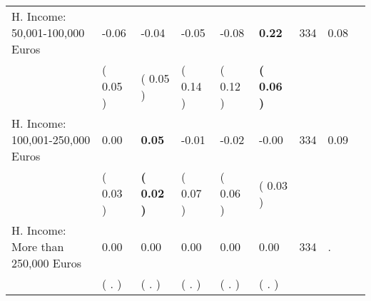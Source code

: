 \begin{tabular}{L{6.2cm} C{1.8cm} C{1.8cm} C{1.8cm} C{1.8cm} C{1.8cm} C{1.8cm} C{0.3cm} C{0.3cm}}
H. Income: 50,001-100,000 Euros &     -0.06 &     -0.04 &     -0.05 &     -0.08 & \textbf{     0.22}  & 334 &       0.08 \\ 
 & (     0.05 ) & (     0.05 ) & (     0.14 ) & (     0.12 ) & \textbf{(     0.06 )}  & \\
H. Income: 100,001-250,000 Euros &      0.00 & \textbf{     0.05} &     -0.01 &     -0.02 &     -0.00  & 334 &       0.09 \\ 
 & (     0.03 ) & \textbf{(     0.02 )} & (     0.07 ) & (     0.06 ) & (     0.03 )  & \\
H. Income: More than 250,000 Euros &      0.00 &      0.00 &      0.00 &      0.00 &      0.00  & 334 &          . \\ 
 & (        . ) & (        . ) & (        . ) & (        . ) & (        . )  & \\
\bottomrule
\end{tabular}
